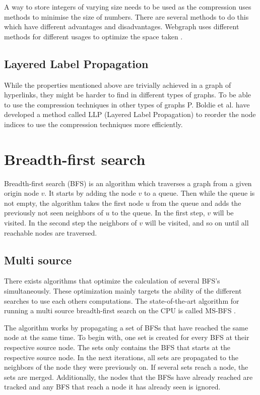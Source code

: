 A way to store integers of varying size needs to be used as the compression uses methods to minimise the size of numbers. There are several methods to do this which have different advantages and disadvantages. Webgraph uses different methods for different usages to optimize the space taken \cite{webgraph-compression}. 

\subsection{Layered Label Propagation}

While the properties mentioned above are trivially achieved in a graph of hyperlinks, they might be harder to find in different types of graphs. To be able to use the compression techniques in other types of graphs P. Boldie et al. have developed a method called LLP (Layered Label Propagation) \cite{llp} to reorder the node indices to use the compression techniques more efficiently. 

\section{Breadth-first search}
Breadth-first search (BFS) is an algorithm which traverses a graph from a given origin node $v$. It starts by adding the node $v$ to a queue. Then while the queue is not empty, the algorithm takes the first node $u$ from the queue and adds the previously not seen neighbors of $u$ to the queue. In the first step, $v$ will be visited. In the second step the neighbors of $v$ will be visited, and so on until all reachable nodes are traversed.

\subsection{Multi source}
There exists algorithms that optimize the calculation of several BFS's simultaneously. These optimization mainly targets the ability of the different searches to use each others computations. The state-of-the-art algorithm for running a multi source breadth-first search on the CPU is called MS-BFS \cite{msbfs}.

The algorithm works by propagating a set of BFSs that have reached the same node at the same time. To begin with, one set is created for every BFS at their respective source node. The sets only contains the BFS that starts at the respective source node. In the next iterations, all sets are propagated to the neighbors of the node they were previously on. If several sets reach a node, the sets are merged. Additionally, the nodes that the BFSs have already reached are tracked and any BFS that reach a node it has already seen is ignored. 

